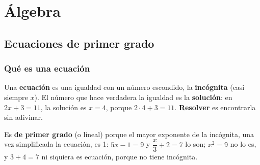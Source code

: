 \chapter{Álgebra}
\newcommand{\rectanum}[3]{\begin{tikzpicture}[x=0.6cm,y=0.6cm,baseline=-3pt]
  \draw[gris] (#1-0.4,0) -- (#2+0.4,0);
  \foreach \k in {#1,...,#2} \draw[gris] (\k,-0.12) -- (\k,0.12);
  #3
\end{tikzpicture}}
\newcommand{\lleno}[1]{\fill[nar] (#1,0) circle (0.16); \node[below=1pt,font=\footnotesize] at (#1,-0.1) {$#1$};}
\newcommand{\vacio}[1]{\filldraw[draw=nar,fill=white,line width=1pt] (#1,0) circle (0.16); \node[below=1pt,font=\footnotesize] at (#1,-0.1) {$#1$};}
\newcommand{\tramo}[2]{\draw[nar,line width=2.4pt] (#1,0) -- (#2,0);}
\newcommand{\flechader}[2]{\draw[nar,line width=2.4pt,-{Stealth[length=7pt]}] (#1,0) -- (#2+0.5,0);}
\newcommand{\flechaizq}[2]{\draw[nar,line width=2.4pt,-{Stealth[length=7pt]}] (#2,0) -- (#1-0.5,0);}

\section{Ecuaciones de primer grado}

\subsection{Qué es una ecuación}
Una \textbf{ecuación} es una igualdad con un número escondido, la \textbf{incógnita} (casi siempre $x$). El número que hace verdadera la igualdad es la \textbf{solución}: en $2x + 3 = 11$, la solución es $x = 4$, porque $2\cdot 4 + 3 = 11$. \textbf{Resolver} es encontrarla sin adivinar.

Es \textbf{de primer grado} (o lineal) porque el mayor exponente de la incógnita, una vez simplificada la ecuación, es 1: $5x - 1 = 9$ y $\dfrac{x}{3} + 2 = 7$ lo son; $x^2 = 9$ no lo es, y $3 + 4 = 7$ ni siquiera es ecuación, porque no tiene incógnita.

